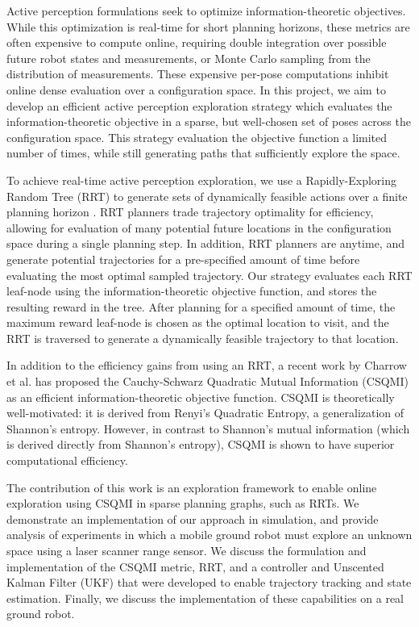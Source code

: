Active perception formulations seek to optimize information-theoretic
objectives. While this optimization is real-time for short planning horizons,
these metrics are often expensive to compute online, requiring double
integration over possible future robot states and measurements, or Monte Carlo sampling
from the distribution of measurements. These expensive per-pose computations inhibit
online dense evaluation over a configuration space. In this project, we aim to develop an
efficient active perception exploration strategy which evaluates the
information-theoretic objective in a sparse, but well-chosen set of poses across the
configuration space. This strategy evaluation the objective function
a limited number of times, while still generating paths that sufficiently explore the space.

To achieve real-time active perception exploration, we use a Rapidly-Exploring Random Tree
(RRT) to generate sets of dynamically feasible actions over a finite planning horizon
\cite{Kuwata09_TCST}. RRT planners trade trajectory optimality for efficiency, allowing for evaluation
of many potential future locations in the configuration space during a single planning
step. In addition, RRT planners are anytime, and generate potential trajectories
for a pre-specified amount of time before evaluating the most optimal sampled trajectory. Our
strategy evaluates each RRT leaf-node using the information-theoretic objective function,
and stores the resulting reward in the tree. After planning for a specified
amount of time, the maximum reward leaf-node is chosen as the optimal location to
visit, and the RRT is traversed to generate a dynamically feasible trajectory to
that location.

In addition to the efficiency gains from using an RRT, a recent work by Charrow
et al. \cite{charrow15} has
proposed the Cauchy-Schwarz Quadratic Mutual Information (CSQMI) as an efficient
information-theoretic objective function. CSQMI is theoretically
well-motivated: it is derived from Renyi's Quadratic Entropy, a generalization of Shannon's entropy.
However, in contrast to Shannon's mutual information (which is derived directly
from Shannon's entropy), CSQMI is shown to have superior computational efficiency.

The contribution of this work is an exploration framework to enable online exploration using CSQMI in sparse
planning graphs, such as RRTs. We demonstrate an implementation of our approach
in simulation, and provide analysis of experiments in which a mobile ground
robot must explore an unknown space using a laser scanner range sensor. We discuss the
formulation and implementation of the CSQMI metric, RRT, and a controller and
Unscented Kalman Filter (UKF) that were developed to enable trajectory tracking and
state estimation. Finally, we discuss the implementation of these capabilities
on a real ground robot.

